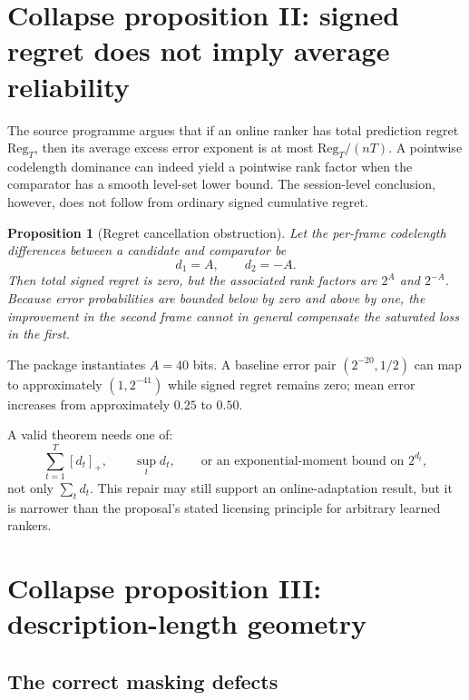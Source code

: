 \documentclass[11pt]{article}
\newtheorem{proposition}{Proposition}
\begin{document}
\section{Collapse proposition II: signed regret does not imply average reliability}

The source programme argues that if an online ranker has total prediction regret $\mathrm{Reg}_T$, then its average excess error exponent is at most $\mathrm{Reg}_T/(nT)$.  A pointwise codelength dominance can indeed yield a pointwise rank factor when the comparator has a smooth level-set lower bound.  The session-level conclusion, however, does not follow from ordinary signed cumulative regret.

\begin{proposition}[Regret cancellation obstruction]
Let the per-frame codelength differences between a candidate and comparator be
\begin{equation}
 d_1=A,
 \qquad
 d_2=-A.
\end{equation}
Then total signed regret is zero, but the associated rank factors are $2^A$ and $2^{-A}$.  Because error probabilities are bounded below by zero and above by one, the improvement in the second frame cannot in general compensate the saturated loss in the first.
\end{proposition}

The package instantiates $A=40$ bits.  A baseline error pair $(2^{-20},1/2)$ can map to approximately $(1,2^{-41})$ while signed regret remains zero; mean error increases from approximately $0.25$ to $0.50$.

A valid theorem needs one of:
\begin{equation}
 \sum_{t=1}^{T}[d_t]_+,
 \qquad
 \sup_t d_t,
 \qquad
 \text{or an exponential-moment bound on }2^{d_t},
\end{equation}
not only $\sum_t d_t$.  This repair may still support an online-adaptation result, but it is narrower than the proposal's stated licensing principle for arbitrary learned rankers.

\section{Collapse proposition III: description-length geometry}

\subsection{The correct masking defects}
\end{document}
